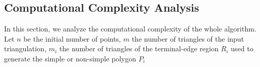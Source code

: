 \documentclass[lineno,pdflatex,sn-mathphys]{sn-jnl}%
\theoremstyle{thmstyleone}%
\theoremstyle{thmstyletwo}%
\theoremstyle{thmstylethree}%
\begin{document}




\subsection{Computational Complexity Analysis}
\label{sub:Complexity Analysis}

In this section, we analyze the computational complexity of  the whole algorithm. Let  $n$ be the initial number of points, $m$ the number of triangles of the input triangulation, $m_i$ the number of triangles of the terminal-edge region $R_i$ used to generate the simple or non-simple  polygon $P_i$%
\end{document}
